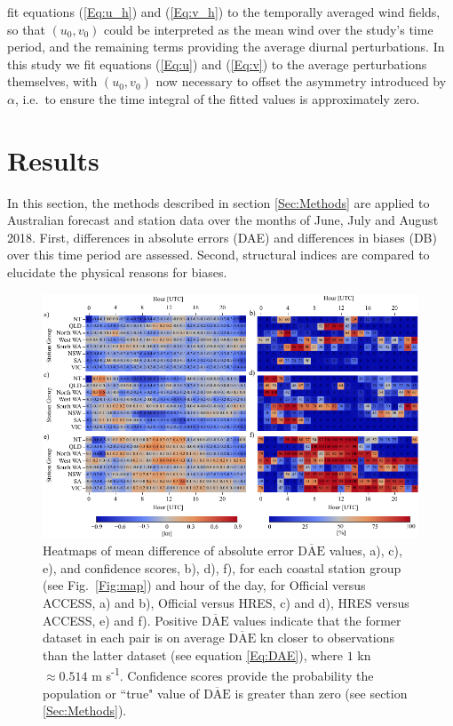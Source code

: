 \documentclass[twocol]{ametsoc}
\begin{document}
\citet{gille05} fit equations (\ref{Eq:u_h}) and (\ref{Eq:v_h}) to the temporally averaged wind fields, so that $\left(u_0, v_0\right)$ could be interpreted as the mean wind over the study's time period, and the remaining terms providing the average diurnal perturbations. In this study we fit equations (\ref{Eq:u}) and (\ref{Eq:v}) to the average perturbations themselves, with $\left(u_0, v_0\right)$ now necessary to offset the asymmetry introduced by $\alpha$, i.e.~to ensure the time integral of the fitted values is approximately zero. 

\section{Results}
\label{Sec:Results}
In this section, the methods described in section \ref{Sec:Methods} are applied to Australian forecast and station data over the months of June, July and August 2018. First, differences in absolute errors (DAE) and differences in biases (DB) over this time period are assessed. Second, structural indices are compared to elucidate the physical reasons for biases. 

\begin{figure}
\centering
\includegraphics[width=39pc]{wpi_coastal.pdf}
\caption{Heatmaps of mean difference of absolute error $\overline{\text{DAE}}$ values, a), c), e), and confidence scores, b), d), f), for each coastal station group (see Fig.~\ref{Fig:map}) and hour of the day, for Official versus ACCESS, a) and b), Official versus HRES, c) and d), HRES versus ACCESS, e) and f). Positive $\overline{\text{DAE}}$ values indicate that the former dataset in each pair is on average $\overline{\text{DAE}}$ kn closer to observations than the latter dataset (see equation \ref{Eq:DAE}), where $1$ kn $\approx 0.514$ m s\textsuperscript{-1}. Confidence scores provide the probability the population or ``true" value of $\overline{\text{DAE}}$ is greater than zero (see section \ref{Sec:Methods}).}
\label{Fig:wpi_coastal}
\end{figure}
\end{document}

